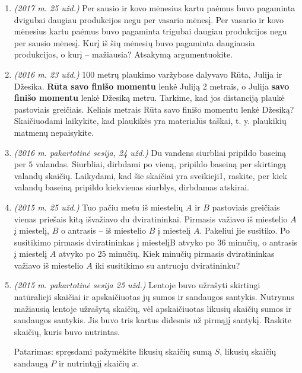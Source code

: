\documentclass[a4paper]{article}
\begin{document}
\begin{enumerate}
      \item \textit{(2017 m. 25 užd.)} Per sausio ir kovo mėnesius kartu paėmus buvo pagaminta dvigubai daugiau produkcijos negu
            per vasario mėnesį. Per vasario ir kovo mėnesius kartu paėmus buvo pagaminta trigubai daugiau
            produkcijos negu per sausio mėnesį. Kurį iš šių mėnesių buvo pagaminta daugiausia produkcijos,
            o kurį – mažiausia? Atsakymą argumentuokite.

      \item \textit{(2016 m. 23 užd.)} 100 metrų plaukimo varžybose dalyvavo Rūta, Julija ir Džesika. \textbf{Rūta savo finišo momentu}
            lenkė Juliją 2 metrais, o Julija \textbf{savo finišo momentu} lenkė Džesiką metru. Tarkime, kad jos
            distanciją plaukė pastoviais greičiais. Keliais metrais Rūta savo finišo momentu lenkė Džesiką?
            Skaičiuodami laikykite, kad plaukikės yra materialūs taškai, t. y. plaukikių matmenų
            nepaisykite.

      \item \textit{(2016 m. pakartotinė sesija, 24 užd.)} Du vandens siurbliai pripildo baseiną per $5$ valandas. Siurbliai, dirbdami po vieną, pripildo
            baseiną per skirtingą valandų skaičių. Laikydami, kad šie skaičiai yra sveikieji1, raskite, per kiek
            valandų baseiną pripildo kiekvienas siurblys, dirbdamas atskirai.

      \item \textit{(2015 m. 25 užd.)} Tuo pačiu metu iš miestelių $A$ ir $B$ pastoviais greičiais vienas priešais kitą išvažiavo du
            dviratininkai. Pirmasis važiavo iš miestelio $A$ į miestelį, $B$ o antrasis – iš miestelio $B$ į
            miestelį $A$. Pakeliui jie susitiko. Po susitikimo pirmasis dviratininkas į miestelįB atvyko po $36$
            minučių, o antrasis į miestelį $A$ atvyko po $25$ minučių. Kiek minučių pirmasis dviratininkas
            važiavo iš miestelio $A$ iki susitikimo su antruoju dviratininku?

      \item \textit{(2015 m. pakartotinė sesija 25 užd.)} Lentoje buvo užrašyti skirtingi natūralieji skaičiai ir apskaičiuotas jų sumos ir sandaugos
            santykis. Nutrynus mažiausią lentoje užrašytą skaičių, vėl apskaičiuotas likusių skaičių sumos ir
            sandaugos santykis. Jis buvo tris kartus didesnis už pirmąjį santykį. Raskite skaičių, kuris buvo
            nutrintas.

            Patarimas: spręsdami pažymėkite likusių skaičių sumą $S$, likusių skaičių
            sandaugą $P$ ir nutrintąjį skaičių $x$.


\end{enumerate}
\end{document}
